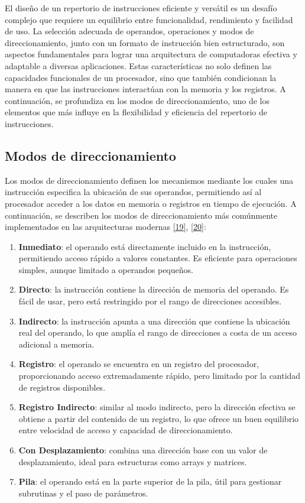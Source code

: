 \documentclass[12pt,oneside]{templates/unerthesis}
\providecommand{\tightlist}{%
  \setlength{\itemsep}{0pt}\setlength{\parskip}{0pt}}
\begin{document}
El diseño de un repertorio de instrucciones eficiente y versátil es un desafío complejo que requiere un equilibrio entre funcionalidad, rendimiento y facilidad de uso. La selección adecuada de operandos, operaciones y modos de direccionamiento, junto con un formato de instrucción bien estructurado, son aspectos fundamentales para lograr una arquitectura de computadoras efectiva y adaptable a diversas aplicaciones. Estas características no solo definen las capacidades funcionales de un procesador, sino que también condicionan la manera en que las instrucciones interactúan con la memoria y los registros. A continuación, se profundiza en los modos de direccionamiento, uno de los elementos que más influye en la flexibilidad y eficiencia del repertorio de instrucciones.

\hypertarget{modos-de-direccionamiento}{%
\subsection{Modos de direccionamiento}\label{modos-de-direccionamiento}}

Los modos de direccionamiento definen los mecanismos mediante los cuales una instrucción especifica la ubicación de sus operandos, permitiendo así al procesador acceder a los datos en memoria o registros en tiempo de ejecución. A continuación, se describen los modos de direccionamiento más comúnmente implementados en las arquitecturas modernas \protect\hyperlink{ref-hennessy2017computer}{{[}19{]}}, \protect\hyperlink{ref-stallings_computer_2021}{{[}20{]}}:

\begin{enumerate}
\def\labelenumi{\alph{enumi})}
\tightlist
\item
  \textbf{Inmediato}: el operando está directamente incluido en la instrucción, permitiendo acceso rápido a valores constantes. Es eficiente para operaciones simples, aunque limitado a operandos pequeños.
\item
  \textbf{Directo}: la instrucción contiene la dirección de memoria del operando. Es fácil de usar, pero está restringido por el rango de direcciones accesibles.
\item
  \textbf{Indirecto}: la instrucción apunta a una dirección que contiene la ubicación real del operando, lo que amplía el rango de direcciones a costa de un acceso adicional a memoria.
\item
  \textbf{Registro}: el operando se encuentra en un registro del procesador, proporcionando acceso extremadamente rápido, pero limitado por la cantidad de registros disponibles.
\item
  \textbf{Registro Indirecto}: similar al modo indirecto, pero la dirección efectiva se obtiene a partir del contenido de un registro, lo que ofrece un buen equilibrio entre velocidad de acceso y capacidad de direccionamiento.
\item
  \textbf{Con Desplazamiento}: combina una dirección base con un valor de desplazamiento, ideal para estructuras como arrays y matrices.
\item
  \textbf{Pila}: el operando está en la parte superior de la pila, útil para gestionar subrutinas y el paso de parámetros.
\end{enumerate}
\end{document}
